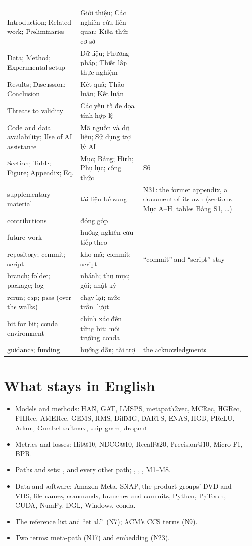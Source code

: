 \documentclass[11pt,a4paper]{article}
\makeatletter
\DeclareRobustCommand{\code}[1]{\texttt{\detokenize{#1}}}
\newcommand{\vi}[1]{\foreignlanguage{vietnamese}{#1}}
\newcommand{\g}[3]{#1 & \vi{#2} & #3 \\}
\newcommand{\grp}[1]{\addlinespace[6pt]\multicolumn{3}{@{}l}{\textbf{#1}} \\ \addlinespace[2pt]}
\makeatother
\begin{document}
{\begin{longtable}{@{}>{\raggedright\arraybackslash}p{}%
  >{\raggedright\arraybackslash}p{}%
  >{\raggedright\arraybackslash}p{}@{}}
  \grp{F. The paper's parts}
  \g{Introduction; Related work; Preliminaries}{Giới thiệu; Các nghiên cứu liên quan; Kiến thức
    cơ sở}{}
  \g{Data; Method; Experimental setup}{Dữ liệu; Phương pháp; Thiết lập thực nghiệm}{}
  \g{Results; Discussion; Conclusion}{Kết quả; Thảo luận; Kết luận}{}
  \g{Threats to validity}{Các yếu tố đe dọa tính hợp lệ}{}
  \g{Code and data availability; Use of AI assistance}{Mã nguồn và dữ liệu; Sử dụng trợ lý AI}{}
  \g{Section; Table; Figure; Appendix; Eq.}{Mục; Bảng; Hình; Phụ lục; công thức}{S6}
  \g{supplementary material}{tài liệu bổ sung}{N31: the former appendix, a document of its own
    (sections Mục A--H, tables Bảng S1, \ldots)}
  \g{contributions}{đóng góp}{}
  \g{future work}{hướng nghiên cứu tiếp theo}{}
  \g{repository; commit; script}{kho mã; commit; script}{``commit'' and ``script'' stay}
  \g{branch; folder; package; log}{nhánh; thư mục; gói; nhật ký}{}
  \g{rerun; cap; pass (over the walks)}{chạy lại; mức trần; lượt}{}
  \g{bit for bit; conda environment}{chính xác đến từng bit; môi trường conda}{}
  \g{guidance; funding}{hướng dẫn; tài trợ}{the acknowledgments}
\end{longtable}}

\section{What stays in English}\label{sec:english}

\begin{itemize}
  \item Models and methods: HAN, GAT, LMSPS, metapath2vec, MCRec, HGRec, FHRec, AMERec, GEMS, RMS,
        DiffMG, DARTS, ENAS, HGB, PReLU, Adam, Gumbel-softmax, skip-gram, dropout.
  \item Metrics and losses: Hit@10, NDCG@10, Recall@20, Precision@10, Micro-F1, BPR.
  \item Paths and sets: \code{PUP}, \code{PCCP} and every other path; \code{a1}, \code{a2},
        \code{c}, M1--M8.
  \item Data and software: Amazon-Meta, SNAP, the product groups' DVD and VHS, file names,
        commands, branches and commits; Python, PyTorch, CUDA, NumPy, DGL, Windows, conda.
  \item The reference list and ``et al.''\ (N7); ACM's CCS terms (N9).
  \item Two terms: meta-path (N17) and embedding (N23).
\end{itemize}
\end{document}
